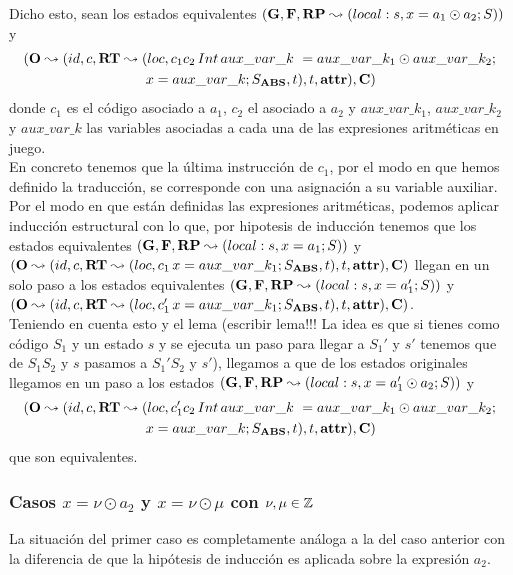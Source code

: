 Dicho esto, sean los estados equivalentes $(\mathbf{G}, \mathbf{F}, \textbf{RP} \leadsto (local:s,x = a_1 \odot a_2\mbox{;\,}S))$ y
\begin{multline*}
  (\mathbf{O} \leadsto (id, c, \textbf{RT} \leadsto (loc, c_1 c_2 \,Int\,aux\_var\_k\ = aux\_var\_k_1 \odot aux\_var\_k_2 \mbox{;\,}\\
  x = aux\_var\_k\mbox{;\,} S_{\textbf{ABS}}, t), t, \textbf{attr}), \mathbf{C})
\end{multline*}
donde $c_1$ es el código asociado a $a_1$, $c_2$ el asociado a $a_2$ y $aux\_var\_k_1$, $aux\_var\_k_2$ y $aux\_var\_k$ las variables asociadas a cada una de las expresiones aritméticas en juego.\\

En concreto tenemos que la última instrucción de $c_1$, por el modo en que hemos definido la traducción, se corresponde con una asignación a su variable auxiliar. Por el modo en que están definidas las expresiones aritméticas, podemos aplicar inducción estructural con lo que, por hipotesis de inducción tenemos que los estados equivalentes $(\mathbf{G}, \mathbf{F}, \textbf{RP} \leadsto (local:s,x = a_1\mbox{;\,}S))$ y $(\mathbf{O} \leadsto (id, c, \textbf{RT} \leadsto (loc, c_1\,x = aux\_var\_k_1\mbox{;\,} S_{\textbf{ABS}}, t), t, \textbf{attr}), \mathbf{C})$ llegan en un solo paso a los estados equivalentes $(\mathbf{G}, \mathbf{F}, \textbf{RP} \leadsto (local:s,x = a_1'\mbox{;\,}S))$ y $(\mathbf{O} \leadsto (id, c, \textbf{RT} \leadsto (loc, c_1'\,x = aux\_var\_k_1\mbox{;\,} S_{\textbf{ABS}}, t), t, \textbf{attr}), \mathbf{C})$.\\

Teniendo en cuenta esto y el lema (escribir lema!!! La idea es que si tienes como código $S_1$ y un estado $s$ y se ejecuta un paso para llegar a $S_1'$ y $s'$ tenemos que de $S_1 S_2$ y $s$ pasamos a $S_1' S_2$ y $s'$), llegamos a que de los estados originales llegamos en un paso a los estados $(\mathbf{G}, \mathbf{F}, \textbf{RP} \leadsto (local:s,x = a_1' \odot a_2\mbox{;\,}S))$ y
\begin{multline*}
  (\mathbf{O} \leadsto (id, c, \textbf{RT} \leadsto (loc, c_1' c_2 \,Int\,aux\_var\_k\ = aux\_var\_k_1 \odot aux\_var\_k_2 \mbox{;\,}\\
  x = aux\_var\_k\mbox{;\,} S_{\textbf{ABS}}, t), t, \textbf{attr}), \mathbf{C})
\end{multline*}
que son equivalentes.

\subsubsection{Casos $x = \nu \odot a_2$ y $x = \nu \odot \mu$ con $\nu, \mu \in \mathbb{Z}$}

La situación del primer caso es completamente análoga a la del caso anterior con la diferencia de que la hipótesis de inducción es aplicada sobre la expresión $a_2$.\\

